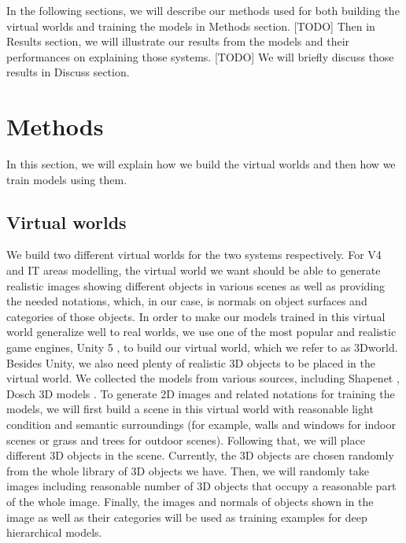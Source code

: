 \documentclass[12pt]{article}
\begin{document}
In the following sections, we will describe our methods used for both building the virtual worlds and training the models in Methods section. [TODO] Then in Results section, we will illustrate our results from the models and their performances on explaining those systems. [TODO] We will briefly discuss those results in Discuss section.

\section*{Methods}

In this section, we will explain how we build the virtual worlds and then how we train models using them.

\subsection*{Virtual worlds}

We build two different virtual worlds for the two systems respectively. For V4 and IT areas modelling, the virtual world we want should be able to generate realistic images showing different objects in various scenes as well as providing the needed notations, which, in our case, is normals on object surfaces and categories of those objects. 
In order to make our models trained in this virtual world generalize well to real worlds, we use one of the most popular and realistic game engines, Unity 5 \cite{unity}, to build our virtual world, which we refer to as 3Dworld. 
Besides Unity, we also need plenty of realistic 3D objects to be placed in the virtual world. We collected the models from various sources, including Shapenet \cite{Chang2015}, Dosch 3D models \cite{dosch}. To generate 2D images and related notations for training the models, we will first build a scene in this virtual world with reasonable light condition and semantic surroundings (for example, walls and windows for indoor scenes or grass and trees for outdoor scenes). 
Following that, we will place different 3D objects in the scene. Currently, the 3D objects are chosen randomly from the whole library of 3D objects we have. Then, we will randomly take images including reasonable number of 3D objects that occupy a reasonable part of the whole image. Finally, the images and normals of objects shown in the image as well as their categories will be used as training examples for deep hierarchical models.
\end{document}
